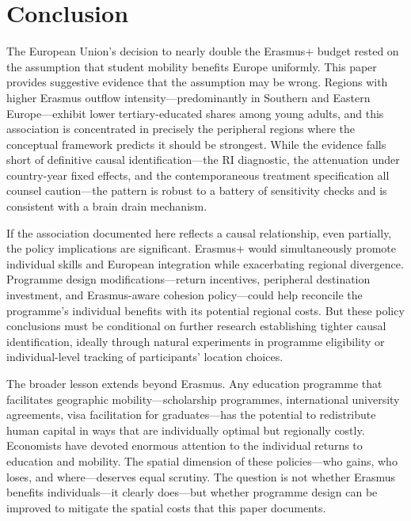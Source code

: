 \documentclass[12pt]{article}
\begin{document}
\section{Conclusion}
\label{sec:conclusion}

The European Union's decision to nearly double the Erasmus+ budget rested on the assumption that student mobility benefits Europe uniformly. This paper provides suggestive evidence that the assumption may be wrong. Regions with higher Erasmus outflow intensity---predominantly in Southern and Eastern Europe---exhibit lower tertiary-educated shares among young adults, and this association is concentrated in precisely the peripheral regions where the conceptual framework predicts it should be strongest. While the evidence falls short of definitive causal identification---the RI diagnostic, the attenuation under country-year fixed effects, and the contemporaneous treatment specification all counsel caution---the pattern is robust to a battery of sensitivity checks and is consistent with a brain drain mechanism.

If the association documented here reflects a causal relationship, even partially, the policy implications are significant. Erasmus+ would simultaneously promote individual skills and European integration while exacerbating regional divergence. Programme design modifications---return incentives, peripheral destination investment, and Erasmus-aware cohesion policy---could help reconcile the programme's individual benefits with its potential regional costs. But these policy conclusions must be conditional on further research establishing tighter causal identification, ideally through natural experiments in programme eligibility or individual-level tracking of participants' location choices.

The broader lesson extends beyond Erasmus. Any education programme that facilitates geographic mobility---scholarship programmes, international university agreements, visa facilitation for graduates---has the potential to redistribute human capital in ways that are individually optimal but regionally costly. Economists have devoted enormous attention to the individual returns to education and mobility. The spatial dimension of these policies---who gains, who loses, and where---deserves equal scrutiny. The question is not whether Erasmus benefits individuals---it clearly does---but whether programme design can be improved to mitigate the spatial costs that this paper documents.
\end{document}
